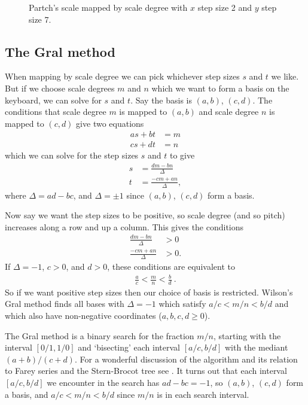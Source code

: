 \documentclass[a4paper,11pt]{article}
\begin{document}
\begin{figure}

\caption{Partch's scale mapped by scale degree with $x$ step size 2 and $y$
step size 7.}
\label{fig:partch2-7}
\end{figure}

\clearpage
\subsection{The Gral method}
When mapping by scale degree we can pick whichever step sizes $s$ and $t$ we
like. But if we choose scale degrees $m$ and $n$ which we want to form a basis
on the keyboard, we can solve for $s$ and $t$. Say the basis is $(a, b)$, $(c,
d)$. The conditions that scale degree $m$ is mapped to $(a, b)$ and scale
degree $n$ is mapped to $(c, d)$ give two equations
\begin{align}
    a s + b t &= m \\
    c s + d t &= n \label{eq:step-sizes}
\end{align}
which we can solve for the step sizes $s$ and $t$ to give
\begin{align}
    s &= \frac{dm-bn}{\Delta} \\
    t &= \frac{-cm + an}{\Delta},
\end{align}
where $\Delta = ad - bc$, and $\Delta = \pm 1$ since $(a, b)$, $(c, d)$ form a
basis.

Now say we want the step sizes to be positive, so scale degree (and so pitch)
increases along a row and up a column. This gives the conditions
\begin{align}
    \frac{ dm - bn}{\Delta} & > 0 \label{eq:positive-1}\\
    \frac{-cm + an}{\Delta} & > 0.\label{eq:positive-2}
\end{align}
If $\Delta = -1$, $c > 0$, and $d > 0$, these conditions are equivalent to
\begin{align}
    \frac{a}{c} < \frac{m}{n} < \frac{b}{d}\ .
\label{eq:positive-special}
\end{align}
So if we want positive step sizes then our choice of basis is restricted.
Wilson's Gral method \cite{wilsongralkeyboard, wilsongralspectrum} finds all
bases with $\Delta = -1$ which satisfy $a/c < m/n < b/d$ and which also have
non-negative coordinates ($a, b, c, d \geq 0$).

The Gral method is a binary search for the fraction $m/n$, starting with the
interval $[0/1, 1/0]$ and `bisecting' each interval $[a/c, b/d]$ with the
mediant $(a+b)/(c+d)$. For a wonderful discussion of the algorithm and its
relation to Farey series and the Stern-Brocot tree see
\cite[121]{knuth1994concrete}. It turns out that each interval $[a/c, b/d]$ we
encounter in the search has $ad - bc = -1$, so $(a, b)$, $(c, d)$ form a basis,
and $a/c < m/n < b/d$ since $m/n$ is in each search interval.
\end{document}
